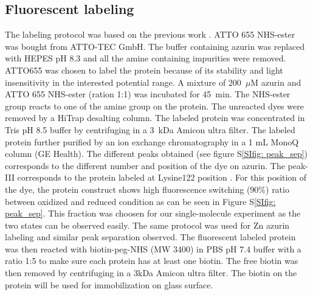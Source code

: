 \subsection{Fluorescent labeling}
The labeling protocol was based on the previous work \cite{nicolardi2012topdown}. ATTO 655 NHS-ester was bought from ATTO-TEC GmbH. The buffer containing azurin was replaced with HEPES pH 8.3 and all the amine containing impurities were removed. ATTO655 was chosen to label the protein because of its stability and light insensitivity in the interested potential range. A mixture of 200~$\mu$M azurin and ATTO 655 NHS-ester (ration 1:1) was incubated for 45~min. The NHS-ester group reacts to one of the amine group on the protein. The unreacted dyes were removed by a HiTrap desalting column. The labeled protein was concentrated in Tris pH 8.5 buffer by centrifuging in a 3~kDa Amicon ultra filter. The labeled protein further purified by an ion exchange chromatography in a 1 mL MonoQ column (GE Health). The different peaks obtained (see figure S\ref{SIfig: peak_sep}) corresponds to the different number and position of the dye on azurin. The peak-III corresponds to the protein labeled at Lysine122 position \cite{nicolardi2012topdown}. For this position of the dye, the protein construct shows high fluorescence switching (90\%) ratio between oxidized and reduced condition as can be seen in Figure S\ref{SIfig: peak_sep}. This fraction was choosen for our single-molecule experiment as the two states can be observed easily. The same protocol was used for Zn azurin labeling and similar peak separation observed. The fluorescent labeled protein was then reacted with biotin-peg-NHS (MW 3400) in PBS pH 7.4 buffer with a ratio 1:5 to make sure each protein has at least one biotin. The free biotin was then removed by centrifuging in a 3kDa Amicon ultra filter. The biotin on the protein will be used for immobilization on glass surface.
